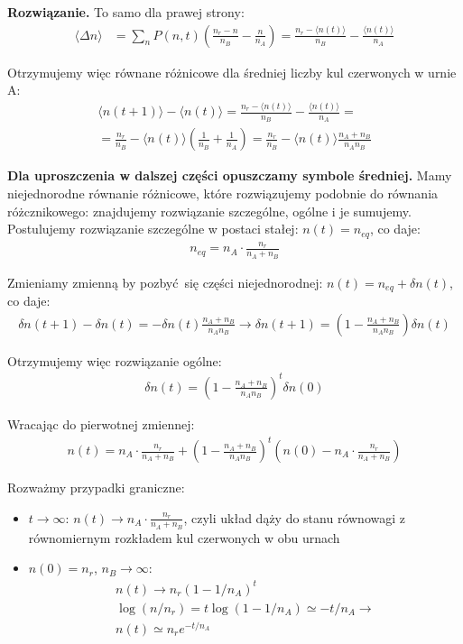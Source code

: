 \documentclass[11pt,a4paper]{article}
\newenvironment{solution}{\vspace{1cm} \par\textbf{Rozwiązanie.} \vspace{1cm}}{}
\begin{document}
\begin{solution}
To samo dla prawej strony:
\begin{align*}
  \langle \Delta n \rangle &= \sum_n P(n,t) \left( \frac{n_r - n}{n_B}  - \frac{n}{n_A} \right) = 
  \frac{n_r - \langle n(t) \rangle}{n_B}  - \frac{\langle n(t) \rangle}{n_A}
\end{align*}

Otrzymujemy więc równane różnicowe dla średniej liczby kul czerwonych w urnie A:
\begin{align*}
  \langle n(t+1) \rangle - \langle n(t) \rangle = 
  \frac{n_r - \langle n(t) \rangle}{n_B}  - \frac{\langle n(t) \rangle}{n_A} = \\
  = \frac{n_r}{n_B} - \langle n(t) \rangle \left( \frac{1}{n_B} + \frac{1}{n_A} \right) =
  \frac{n_r}{n_B} - \langle n(t) \rangle \frac{n_A + n_B}{n_A n_B}
\end{align*}

{\bf Dla uproszczenia w dalszej części opuszczamy symbole średniej.}
Mamy niejednorodne równanie różnicowe, które rozwiązujemy podobnie do
równania różcznikowego: znajdujemy rozwiązanie szczególne, ogólne
i je sumujemy.
Postulujemy rozwiązanie szczególne w postaci stałej: $n(t) = n_{eq}$, co daje:
\begin{align*}
  n_{eq} = n_A \cdot \frac{n_r}{n_A + n_B}
\end{align*}

Zmieniamy zmienną by pozbyć się części niejednorodnej: 
$n(t) = n_{eq} + \delta n(t)$, co daje:
\begin{align*}
  \delta n(t+1) - \delta n(t) = -\delta n(t) \frac{n_A + n_B}{n_A n_B} \rightarrow
  \delta n(t+1) = \left( 1 - \frac{n_A + n_B}{n_A n_B} \right) \delta n(t)
\end{align*}

Otrzymujemy więc rozwiązanie ogólne:
\begin{align*}
  \delta n(t) = \left( 1 - \frac{n_A + n_B}{n_A n_B} \right)^t \delta n(0)
\end{align*}

Wracając do pierwotnej zmiennej:
\begin{align*}
  n(t) = n_A \cdot \frac{n_r}{n_A + n_B} + \left( 1 - \frac{n_A + n_B}{n_A n_B} \right)^t (n(0) - n_A \cdot \frac{{n_r}}{n_A + n_B})
\end{align*}

\vspace{0.5cm}

Rozważmy przypadki graniczne:
\begin{itemize}
  \item $t \to \infty$: $n(t) \to n_A \cdot \frac{n_r}{n_A + n_B}$, czyli układ 
  dąży do stanu równowagi z równomiernym rozkładem kul czerwonych w obu urnach
  \item $n(0) = n_{r}$, $n_{B} \to \infty$:
  \begin{align*}
    n(t) \to n_{r}(1 - 1/n_A)^t \\
    \log(n/n_{r}) = t\log(1-1/n_A) \simeq -t/n_A \to \\
    n(t) \simeq n_{r} e^{-t/n_A}
  \end{align*}
\end{itemize}


\end{solution}
\end{document}
